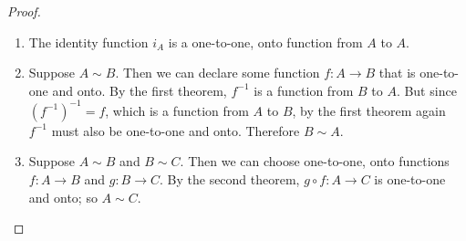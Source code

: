 \documentclass{report}
\theoremstyle{definition}
\begin{document}
\begin{proof}\hspace{1mm}
\begin{enumerate}
\item The identity function $i_A$ is a one-to-one, onto function from $A$ to $A$.
\item Suppose $A\sim B$. Then we can declare some function $f:A\to B$ that is one-to-one and onto. By the first
theorem, $f^{-1}$ is a function from $B$ to $A$. But 
since $(f^{-1})^{-1}=f$, which is a function from $A$ to $B$, by the first theorem again $f^{-1}$ must also be 
one-to-one and onto. Therefore $B\sim A$.
\item Suppose $A\sim B$ and $B\sim C$. Then we can choose one-to-one, onto functions $f:A\to B$ and $g:B\to C$.
By the second theorem, $g\circ f:A\to C$ is one-to-one and onto; so $A\sim C$.\qedhere
\end{enumerate}
\end{proof}
\newpage
\end{document}
